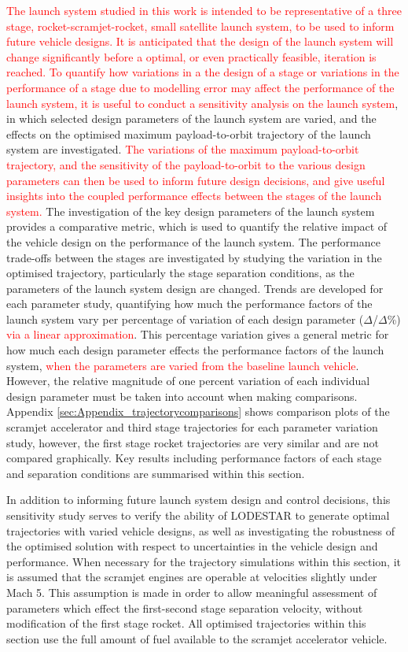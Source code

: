 \textcolor{red}{The launch system studied in this work is intended to be representative of a three stage, rocket-scramjet-rocket, small satellite launch system, to be used to inform future vehicle designs. It is anticipated that the design of the launch system will change significantly before a optimal, or even practically feasible, iteration is reached. 
	To quantify how variations in a the design of a stage or variations in the performance of a stage due to modelling error may affect the performance of the launch system, it is useful to conduct a sensitivity analysis on the launch system}, in which selected design parameters of the launch system are varied, and the effects on the optimised maximum payload-to-orbit trajectory of the launch system are investigated. \textcolor{red}{The variations of the maximum payload-to-orbit trajectory, and the sensitivity of the payload-to-orbit to the various design parameters can then be used to inform future design decisions, and give useful insights into the coupled performance effects between the stages of the launch system.} 
The investigation of the key design parameters of the launch system provides a comparative metric, which is used to quantify the relative impact of the vehicle design on the performance of the launch system. The performance trade-offs between the stages are investigated by studying the variation in the optimised trajectory, particularly the stage separation conditions, as the parameters of the launch system design are changed. 
Trends are developed for each parameter study, quantifying how much the performance factors of the launch system vary per percentage of variation of each design parameter ($\Delta$/$\Delta$\%) \textcolor{red}{via a linear approximation}. This percentage variation gives a general metric for how much each design parameter effects the performance factors of the launch system, \textcolor{red}{when the parameters are varied from the baseline launch vehicle}. However, the relative magnitude of one percent variation of each individual design parameter must be taken into account when making comparisons. 
Appendix \ref{sec:Appendix_trajectorycomparisons} shows comparison plots of the scramjet accelerator and third stage trajectories for each parameter variation study, however, the first stage rocket trajectories are very similar and are not compared graphically. Key results including performance factors of each stage and separation conditions are summarised within this section.


In addition to informing future launch system design and control decisions, this sensitivity study serves to verify the ability of LODESTAR to generate optimal trajectories with varied vehicle designs, as well as investigating the robustness of the optimised solution with respect to uncertainties in the vehicle design and performance.
When necessary for the trajectory simulations within this section, it is assumed that the scramjet engines are operable at velocities slightly under Mach 5. This assumption is made in order to allow meaningful assessment of parameters which effect the first-second stage separation velocity, without modification of the first stage rocket.
All optimised trajectories within this section use the full amount of fuel available to the scramjet accelerator vehicle. 


